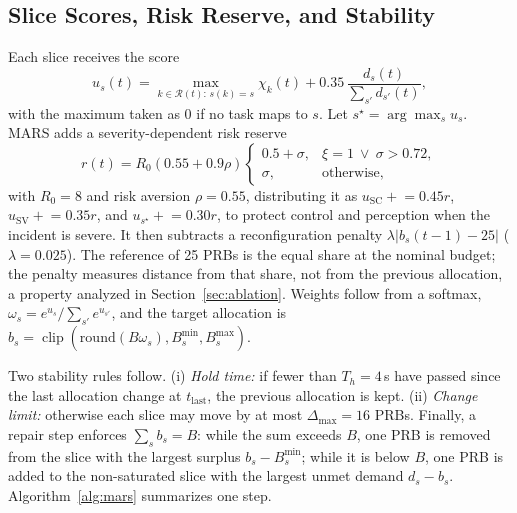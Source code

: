\documentclass[conference]{IEEEtran}
\DeclareMathOperator{\clip}{clip}
\begin{document}
\subsection{Slice Scores, Risk Reserve, and Stability}
Each slice receives the score
\begin{equation}
u_s(t)=\max_{k\in\mathcal{R}(t):\,s(k)=s}\chi_k(t)+0.35\,\frac{d_s(t)}{\sum_{s'}d_{s'}(t)},
\label{eq:score}
\end{equation}
with the maximum taken as 0 if no task maps to $s$. Let $s^\star=\arg\max_s u_s$. MARS adds a severity-dependent risk reserve
\begin{equation}
r(t)=R_0(0.55+0.9\rho)\begin{cases}0.5+\sigma, & \xi=1\ \vee\ \sigma>0.72,\\ \sigma, & \text{otherwise},\end{cases}
\label{eq:reserve}
\end{equation}
with $R_0=8$ and risk aversion $\rho=0.55$, distributing it as $u_{\mathrm{SC}}\mathrel{+}=0.45r$, $u_{\mathrm{SV}}\mathrel{+}=0.35r$, and $u_{s^\star}\mathrel{+}=0.30r$, to protect control and perception when the incident is severe. It then subtracts a reconfiguration penalty $\lambda|b_s(t-1)-25|$ ($\lambda=0.025$). The reference of 25 PRBs is the equal share at the nominal budget; the penalty measures distance from that share, not from the previous allocation, a property analyzed in Section~\ref{sec:ablation}. Weights follow from a softmax, $\omega_s=e^{u_s}/\sum_{s'}e^{u_{s'}}$, and the target allocation is $\hat b_s=\clip(\mathrm{round}(B\omega_s),B_s^{\min},B_s^{\max})$.

Two stability rules follow. (i) \emph{Hold time:} if fewer than $T_h=4$\,s have passed since the last allocation change at $t_{\mathrm{last}}$, the previous allocation is kept. (ii) \emph{Change limit:} otherwise each slice may move by at most $\Delta_{\max}=16$ PRBs. Finally, a repair step enforces $\sum_s b_s=B$: while the sum exceeds $B$, one PRB is removed from the slice with the largest surplus $b_s-B_s^{\min}$; while it is below $B$, one PRB is added to the non-saturated slice with the largest unmet demand $d_s-b_s$. Algorithm~\ref{alg:mars} summarizes one step.
\end{document}

